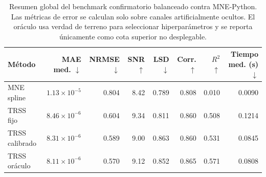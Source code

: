 \begin{table}[htbp]
\centering
\footnotesize
\caption{Resumen global del benchmark confirmatorio balanceado contra MNE-Python. Las métricas de error se calculan solo sobre canales artificialmente ocultos. El oráculo usa verdad de terreno para seleccionar hiperparámetros y se reporta únicamente como cota superior no desplegable.}
\label{tab:ch6_global_summary}
\begin{tabular}{@{}lrrrrrrr@{}}
\toprule
Método & MAE med. $\downarrow$ & NRMSE $\downarrow$ & SNR $\uparrow$ & LSD $\downarrow$ & Corr. $\uparrow$ & $R^2$ $\uparrow$ & Tiempo med. (s) $\downarrow$ \\
\midrule
MNE spline & $1.13\times 10^{-5}$ & 0.804 & 8.42 & 0.789 & 0.808 & 0.010 & 0.0090 \\
TRSS fijo & $8.46\times 10^{-6}$ & 0.604 & 9.34 & 0.811 & 0.860 & 0.508 & 0.1214 \\
TRSS calibrado & $8.31\times 10^{-6}$ & 0.589 & 9.00 & 0.863 & 0.860 & 0.531 & 0.0845 \\
TRSS oráculo & $8.11\times 10^{-6}$ & 0.570 & 9.12 & 0.852 & 0.865 & 0.571 & 0.0808 \\
\bottomrule
\end{tabular}
\end{table}
